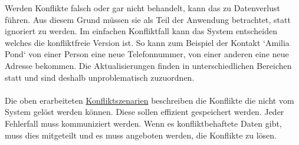 Werden Konflikte falsch oder gar nicht behandelt, kann das zu Datenverlust führen.
Aus diesem Grund müssen sie als Teil der Anwendung betrachtet, statt ignoriert zu werden.
Im einfachen Konfliktfall kann das System entscheiden welches die konfliktfreie Version ist.
So kann zum Beispiel der Kontakt `Amilia Pond` von einer Person eine neue Telefonnummer, von einer anderen eine neue Adresse bekommen.
Die Aktualisierungen finden in unterschiedlichen Bereichen statt und sind deshalb unproblematisch zuzuordnen.\\\\
Die oben erarbeiteten \hyperref[chap:konfliktszenarien]{Konfliktszenarien} beschreiben die Konflikte die nicht vom System gelöst werden können.
Diese sollen effizient gespeichert werden.
Jeder Fehlerfall muss kommuniziert werden. Wenn es konfliktbehaftete Daten gibt, muss dies mitgeteilt und es muss angeboten werden, die Konflikte zu lösen.
